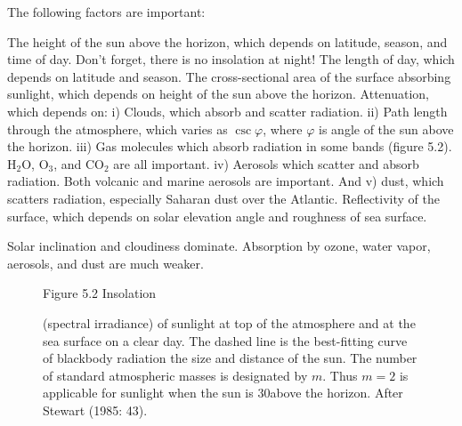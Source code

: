 The following factors are important:
\begin{enumerate}
\vitem
The height of the sun above the
horizon, which depends on latitude, season, and time of day. Don't
forget, there is no insolation at night!
\vitem
The length of day, which depends on latitude and season.
\vitem
The cross-sectional area of the surface absorbing sunlight, which
depends on height of the sun above the horizon.
\vitem
Attenuation, which depends on: i) Clouds, which absorb and scatter
radiation. ii) Path length through the atmosphere, which varies as
$\csc \varphi$, where $\varphi$ is angle of the sun above the
horizon. iii) Gas molecules which absorb radiation in some bands
(figure 5.2). H$_2$O, O$_3$, and CO$_2$ are all important. iv)
Aerosols which scatter and absorb radiation. Both volcanic and marine
aerosols are important. And v) dust, which scatters radiation,
especially Saharan dust over the Atlantic.
\vitem
Reflectivity of the surface, which depends on solar elevation angle
and roughness of sea surface.
\end{enumerate}
Solar inclination and cloudiness dominate. Absorption by ozone, water
vapor, aerosols, and dust are much weaker.

\begin{figure}[t!]
\footnotesize
Figure 5.2 Insolation
\rule{0pt}{3ex}(spectral irradiance) of sunlight at top of the
atmosphere and at the sea surface on a clear day. The dashed line is
the best-fitting curve of blackbody radiation the size and distance of
the sun.  The number of standard atmospheric masses is designated by
$m$. Thus $m = 2$ is applicable for sunlight when the
sun is 30\degrees above the
horizon. After Stewart (1985: 43).
\label{fig:insolation}
\vspace{-3ex}
\end{figure}

